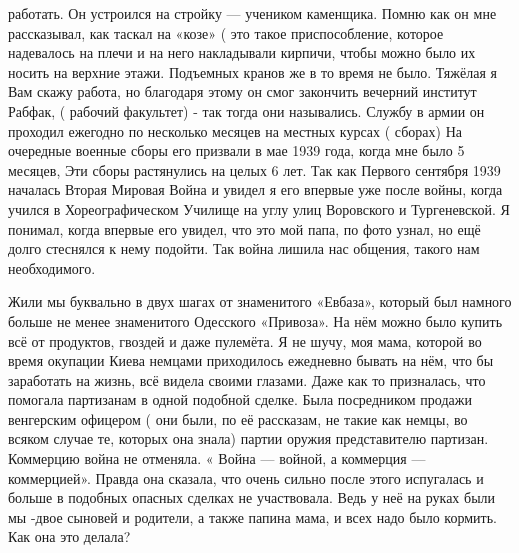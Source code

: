 работать. Он устроился на стройку — учеником каменщика. Помню как он мне
рассказывал, как таскал на «козе» ( это такое приспособление, которое
надевалось на плечи и на него накладывали кирпичи, чтобы можно было их носить
на верхние этажи. Подъемных кранов же в то время не было. Тяжёлая я Вам скажу
работа, но благодаря этому он смог закончить вечерний институт  Рабфак, (
рабочий факультет) - так  тогда они назывались. Службу в армии он проходил
ежегодно по несколько месяцев  на  местных  курсах ( сборах)  На очередные
военные сборы его призвали  в мае 1939 года, когда мне было 5 месяцев, Эти
сборы растянулись на целых 6 лет. Так как Первого сентября 1939 началась Вторая
Мировая Война и увидел я его впервые уже после войны, когда учился в
Хореографическом Училище на углу улиц Воровского и Тургеневской.  Я понимал,
когда впервые его увидел, что это мой папа, по фото  узнал, но  ещё долго
стеснялся  к нему подойти. Так война лишила нас общения, такого  нам
необходимого.

Жили мы буквально в двух шагах от знаменитого «Евбаза», который был намного
больше не менее знаменитого Одесского «Привоза». На нём можно было купить всё
от продуктов, гвоздей и даже пулемёта. Я не шучу, моя мама, которой  во время
окупации Киева немцами приходилось ежедневно бывать на нём, что бы заработать
на жизнь, всё видела  своими глазами. Даже как то призналась, что помогала
партизанам  в одной подобной сделке. Была посредником продажи  венгерским
офицером ( они были, по её рассказам, не такие как немцы, во всяком случае те,
которых она знала)  партии оружия представителю партизан. Коммерцию война не
отменяла. « Война — войной, а коммерция — коммерцией». Правда она сказала, что
очень сильно после этого испугалась и больше в подобных опасных сделках не
участвовала. Ведь у неё на руках были мы -двое сыновей и родители, а также
папина мама, и всех  надо было кормить.    Как она это делала?

